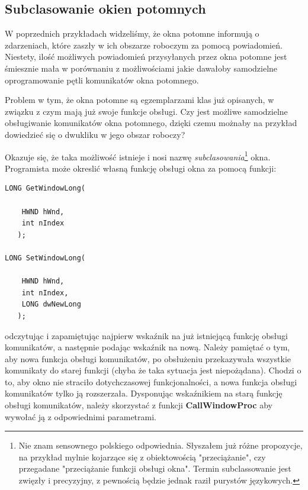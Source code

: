 \subsection{Subclasowanie okien potomnych}

W poprzednich przykładach widzeliśmy, że okna potomne informują o zdarzeniach, które
zaszły w ich obszarze roboczym za pomocą powiadomień. Niestety, ilość możliwych
powiadomień przysyłanych przez okna potomne jest śmiesznie mała w porównaniu z
możliwościami jakie dawałoby samodzielne oprogramowanie pętli komunikatów okna potomnego.

Problem w tym, że okna potomne są egzemplarzami klas już opisanych, w związku z czym mają
już swoje funkcje obsługi. Czy jest możliwe samodzielne obsługiwanie komunikatów okna
potomnego, dzięki czemu możnaby na przykład dowiedzieć się o dwukliku w jego obszar roboczy?

Okazuje się, że taka możliwość istnieje i nosi nazwę {\em subclasowania}\footnote{Nie znam sensownego 
polskiego odpowiednia. Słyszałem już różne propozycje, na przykład
mylnie kojarzące się z obiektowością "przeciążanie", czy przegadane "przeciążanie funkcji obsługi okna".
Termin subclassowanie jest zwięzły i precyzyjny, z pewnością będzie jednak raził purystów językowych.} okna.
Programista może okreslić własną funkcję obsługi okna za pomocą funkcji:
\label{subclassingAPIFunkcje}

\begin{scriptsize}
\begin{verbatim}
LONG GetWindowLong(

    HWND hWnd,	
    int nIndex 	
   );	

LONG SetWindowLong(

    HWND hWnd,	
    int nIndex,	
    LONG dwNewLong 	
   );
\end{verbatim}
\end{scriptsize}

odczytując i zapamiętując najpierw wskaźnik na już istniejącą funkcję obsługi komunikatów, a następnie
podając wskaźnik na nową. Należy pamiętać o tym, aby nowa funkcja obsługi komunikatów, po obsłużeniu
przekazywała wszystkie komunikaty do starej funkcji (chyba że taka sytuacja jest niepożądana). Chodzi o to,
aby okno nie straciło dotychczasowej funkcjonalności, a nowa funkcja obsługi komunikatów tylko ją
rozszerzała. Dysponując wskaźnikiem na starą funkcję obsługi komunikatów, należy skorzystać z funkcji
{\bf CallWindowProc} aby wywołać ją z odpowiednimi parametrami.

